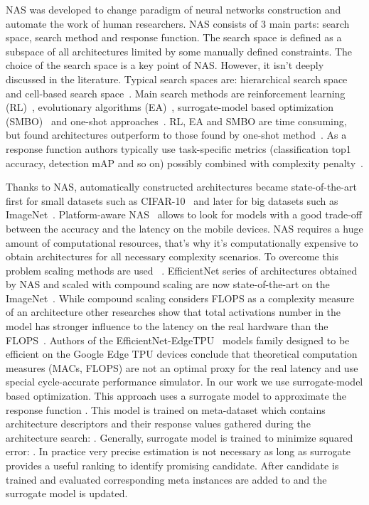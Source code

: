 \documentclass[letterpaper]{article}
\begin{document}
NAS was developed to change paradigm of neural networks construction and automate the work of  human researchers. NAS consists of 3 main parts: search space, search method and response function. The search space is defined as a subspace of all architectures limited by some manually defined constraints. The choice of the search space is a key point of NAS. However, it isn't deeply discussed in the literature. Typical search spaces are: hierarchical search space~\cite{tan2019mnasnet} and cell-based search space~\cite{ZophNasNet}. Main search  methods are reinforcement learning (RL)~\cite{zoph2016RL}, evolutionary algorithms (EA)~\cite{AmoebaReal}, surrogate-model based optimization (SMBO)~\cite{PNASNet,luo2019neural} and one-shot approaches~\cite{DARTS}. RL, EA and SMBO are time consuming, but found architectures outperform to those found by one-shot method~\cite{NASSurvey}. As a response function authors typically use task-specific metrics (classification top1 accuracy, detection mAP and so on) possibly combined with complexity penalty~\cite{ProxylessNAS}.

Thanks to NAS, automatically constructed architectures became state-of-the-art first for small datasets such as CIFAR-10~\cite{wang2021sampleefficient} and later for big datasets such as ImageNet~\cite{tan2020efficientnet}. 
Platform-aware NAS~\cite{tan2019mnasnet} allows to look for models with a good trade-off between the accuracy and the latency on the mobile devices. NAS requires a huge amount of computational resources, that's why it's computationally expensive to obtain architectures for all necessary complexity scenarios. To overcome this problem scaling methods are used ~\cite{tan2020efficientnet}. EfficientNet series of architectures obtained by NAS and scaled with compound scaling are now state-of-the-art on the ImageNet~\cite{pham2021meta}. While compound scaling considers FLOPS as a complexity measure of an architecture other researches show that total activations number in the model has stronger influence to the latency on the real hardware than the FLOPS~\cite{radosavovic2020designing}. Authors of the EfficientNet-EdgeTPU~\cite{gupta2020acceleratoraware} models family designed to be efficient on the Google Edge TPU devices conclude that theoretical computation measures (MACs, FLOPS) are not an optimal proxy for the real latency and use special cycle-accurate performance simulator.
In our work we use surrogate-model based optimization. This approach uses a surrogate model  to approximate the response function . This model is trained on meta-dataset which contains architecture descriptors and their response values gathered during the architecture search: . Generally, surrogate model is trained to minimize squared error: . In practice very precise estimation is not necessary as long as surrogate provides a useful ranking to identify promising candidate. After candidate  is trained and evaluated corresponding meta instances  are added to  and the surrogate model is updated.
\end{document}
